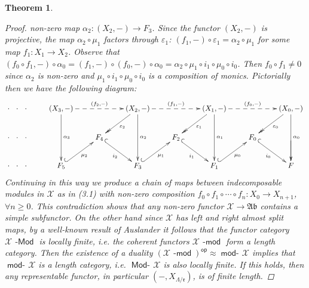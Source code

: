 \documentclass[oneside, a4paper,reqno]{amsart}
\numberwithin{equation}{section}
\newtheorem{thm}{Theorem}[section]
\theoremstyle{definition}
\begin{document}
\begin{thm}
\begin{proof}
non-zero map $\alpha_{2} \colon (X_{2},-) {\longrightarrow} F_{3}$. Since the
functor $(X_{2},-)$ is projective, the map $\alpha_{2}\circ \mu_{1}$
factors through $\varepsilon_{1}$: $(f_{1},-) \circ \varepsilon_{1}
= \alpha_{2}\circ \mu_{1}$ for some map $f_{1} \colon X_{1} {\longrightarrow}
X_{2}$. Observe that $(f_{0}\circ f_{1},-) \circ \alpha_{0} =
(f_{1},-) \circ (f_{0},-) \circ \alpha_{0} = \alpha_{2} \circ \mu_{1}\circ i_{1}
\circ \mu_{0} \circ i_{0}$. Then $f_{0} \circ f_{1} \neq 0$ since
$\alpha_{2}$ is non-zero and $\mu_{1}\circ i_{1} \circ \mu_{0} \circ
i_{0}$ is a composition of monics. Pictorially then we have the
following diagram:
 {\small\[\xymatrix{
   \cdot \, \,\  \cdot \,\,\  \cdot        & (X_3,-) \ar[dd]^{\alpha_3} \ar@{-->}[rr]^{(f_2,-)}  &
   &  (X_2,-) \ar[dd]^{\alpha_2} \ar@{-->}[rr]^{(f_1,-)} \ar@{->>}[dl]^{\varepsilon_2} &   & (X_1,-) \ar[dd]^{\alpha_1}
   \ar@{-->}[rr]^{(f_0,-)} \ar@{->>}[dl]^{\varepsilon_1}
  &  & (X_0,-) \ar@{->>}[dl]^{\varepsilon_0}  \ar[dd]^{\alpha_0}  \\
    \cdot \, \,\  \cdot \,\,\  \cdot &   &  F_4 \ar@{^{(}->}[dr]_{i_2} &  &  F_2  \ar@{^{(}->}[dr]_{i_1} &
     &  F_0  \ar@{^{(}->}[dr]_{i_0} &  \ar[d]^{} \\
   \cdot \, \,\  \cdot \,\,\  \cdot &  F_5 \ar@{^{(}->}[ur]_{\mu_2} &   & F_3 \ar@{^{(}->}[ur]_{\mu_1}  &
    &  F_1 \ar@{^{(}->}[ur]_{\mu_0} &   & F   }\]}
Continuing in this way we produce a chain of maps between
indecomposable modules in ${\mathcal X}$ as in (3.1) with non-zero composition
$f_{0} \circ f_{1} \circ \cdots \circ f_{n} \colon X_{0} {\longrightarrow}
X_{n+1}$, $\forall n \geq 0$. This contradiction shows that any
non-zero functor ${\mathcal X} {\longrightarrow} {\mathfrak{Ab}}$ contains a simple subfunctor. On the
other hand since ${\mathcal X}$ has left and right almost split maps, by a
well-known result of Auslander \cite{Auslander:II} it follows that
the functor category ${\mathcal X}\operatorname*{\!-\mathsf{Mod}}$ is locally finite, i.e. the coherent
functors ${\mathcal X}\operatorname*{\!-\mathsf{mod}}$ form a length category. Then the existence of a
duality $({\mathcal X}\operatorname*{\!-\mathsf{mod}})^\operatorname*{\mathsf{op}} \approx \operatorname*{\mathsf{mod}-\!}{\mathcal X}$ implies that $\operatorname*{\mathsf{mod}-\!}{\mathcal X}$ is
a length category, i.e. $\operatorname*{\mathsf{Mod}-\!}{\mathcal X}$ is also locally finite. If this
holds, then any representable functor, in particular
$(-,X_{\Lambda/\mathfrak{r}})$, is of finite length.


\end{proof}
\end{thm}
\end{document}
